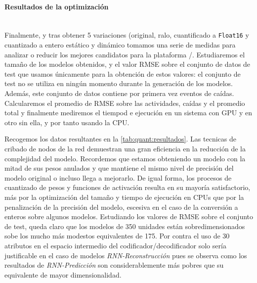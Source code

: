 \paragraph{Resultados de la optimización}\\
Finalmente, y tras obtener 5 variaciones (original, ralo, cuantificado a \texttt{Float16} y cuantizado a entero estático y dinámico tomamos una serie de medidas para analizar o reducir los mejores candidatos para la plataforma \ifell/. Estudiaremos el tamaño de los modelos obtenidos, y el valor RMSE sobre el conjunto de datos de test que usamos únicamente para la obtención de estos valores: el conjunto de test no se utiliza en ningún momento durante la generación de los modelos. Además, este conjunto de datos contiene por primera vez eventos de caídas. Calcularemos el promedio de RMSE sobre las actividades, caídas y el promedio total y finalmente mediremos el tiempod e ejecución en un sistema con GPU y en otro sin ella, y por tanto usando la CPU.

  Recogemos los datos resultantes en la \autoref{tab:quant:resultados}. Las tecnicas de cribado de nodos de la red demuestran una gran eficiencia en la reducción de la complejidad del modelo. Recordemos que estamos obteniendo un modelo con la mitad de sus pesos anulados y que mantiene el mismo nivel de precisión del modelo original o incluso llega a mejorarlo. De igual forma, los procesos de cuantizado de pesos y funciones de activación resulta en su mayoría satisfactorio, más por la optimización del tamaño y tiempo de ejecución en CPUs que por la penalización de la precisión del modelo, escesiva en el caso de la conversión a enteros sobre algunos modelos. Estudiando los valores de RMSE sobre el conjunto de test, queda claro que los modelos de 350 unidades están sobredimensionados sobe los mucho más modestos equivalentes de 175. Por contra el uso de 30 atributos en el espacio intermedio del codificador/decodificador solo sería justificable en el caso de modelos \textit{RNN-Reconstrucción} pues se observa como los resultados de \textit{RNN-Predicción} son considerablemente más pobres que su equivalente de mayor dimensionalidad.

